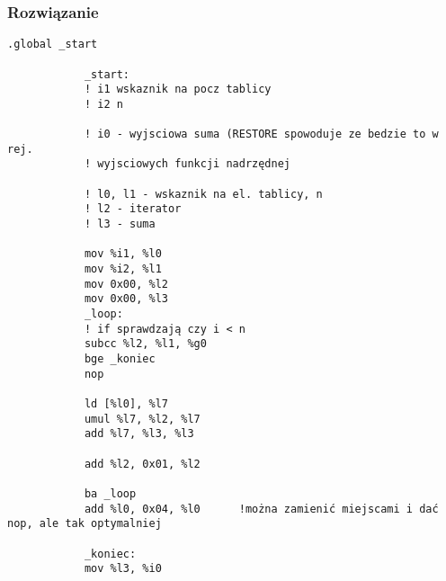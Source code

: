 		\subsubsection{Rozwiązanie}
			\begin{lstlisting}[language={[sparc]Assembler}]
			.global _start
			
			_start:
			! i1 wskaznik na pocz tablicy
			! i2 n
			
			! i0 - wyjsciowa suma (RESTORE spowoduje ze bedzie to w rej.
			! wyjsciowych funkcji nadrzędnej
			
			! l0, l1 - wskaznik na el. tablicy, n
			! l2 - iterator
			! l3 - suma
			
			mov %i1, %l0
			mov %i2, %l1
			mov 0x00, %l2
			mov 0x00, %l3
			_loop:
			! if sprawdzają czy i < n
			subcc %l2, %l1, %g0
			bge _koniec
			nop
			
			ld [%l0], %l7
			umul %l7, %l2, %l7
			add %l7, %l3, %l3
			
			add %l2, 0x01, %l2
			
			ba _loop
			add %l0, 0x04, %l0		!można zamienić miejscami i dać nop, ale tak optymalniej
			
			_koniec:
			mov %l3, %i0
			\end{lstlisting}